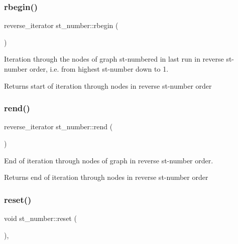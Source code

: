 \subsubsection{\texorpdfstring{rbegin()}{rbegin()}}
{\footnotesize\ttfamily reverse\+\_\+iterator st\+\_\+number\+::rbegin (\begin{DoxyParamCaption}{ }\end{DoxyParamCaption})\hspace{0.3cm}{\ttfamily [inline]}}



Iteration through the nodes of graph st-\/numbered in last run in reverse st-\/number order, i.\+e. from highest st-\/number down to 1. 

\begin{DoxyReturn}{Returns}
start of iteration through nodes in reverse st-\/number order 
\end{DoxyReturn}
\mbox{\label{classst__number_a4c5fdce6ab2be7ee9ddbb09e8d5c8560}} 
\subsubsection{\texorpdfstring{rend()}{rend()}}
{\footnotesize\ttfamily reverse\+\_\+iterator st\+\_\+number\+::rend (\begin{DoxyParamCaption}{ }\end{DoxyParamCaption})\hspace{0.3cm}{\ttfamily [inline]}}



End of iteration through nodes of graph in reverse st-\/number order. 

\begin{DoxyReturn}{Returns}
end of iteration through nodes in reverse st-\/number order 
\end{DoxyReturn}
\mbox{\label{classst__number_ae6f86706b8ae3495d3794b8c684fff0f}} 
\subsubsection{\texorpdfstring{reset()}{reset()}}
{\footnotesize\ttfamily void st\+\_\+number\+::reset (\begin{DoxyParamCaption}{ }\end{DoxyParamCaption})\hspace{0.3cm}{\ttfamily [inline]}, {\ttfamily [virtual]}}



